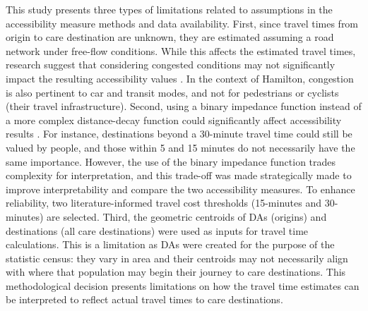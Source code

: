 \documentclass[
  authoryear,
  preprint,
  3p]{elsarticle}
\begin{document}
This study presents three types of limitations related to assumptions in
the accessibility measure methods and data availability. First, since
travel times from origin to care destination are unknown, they are
estimated assuming a road network under free-flow conditions. While this
affects the estimated travel times, research suggest that considering
congested conditions may not significantly impact the resulting
accessibility values \citep{yiannakouliasEstimatingEffectTurn2013}. In
the context of Hamilton, congestion is also pertinent to car and transit
modes, and not for pedestrians or cyclists (their travel
infrastructure). Second, using a binary impedance function instead of a
more complex distance-decay function could significantly affect
accessibility results
\citep{kapatsilaResolvingAccessibilityDilemma2023}. For instance,
destinations beyond a 30-minute travel time could still be valued by
people, and those within 5 and 15 minutes do not necessarily have the
same importance. However, the use of the binary impedance function
trades complexity for interpretation, and this trade-off was made
strategically made to improve interpretability and compare the two
accessibility measures. To enhance reliability, two literature-informed
travel cost thresholds (15-minutes and 30-minutes) are selected. Third,
the geometric centroids of DAs (origins) and destinations (all care
destinations) were used as inputs for travel time calculations. This is
a limitation as DAs were created for the purpose of the statistic
census: they vary in area and their centroids may not necessarily align
with where that population may begin their journey to care destinations.
This methodological decision presents limitations on how the travel time
estimates can be interpreted to reflect actual travel times to care
destinations.
\end{document}
